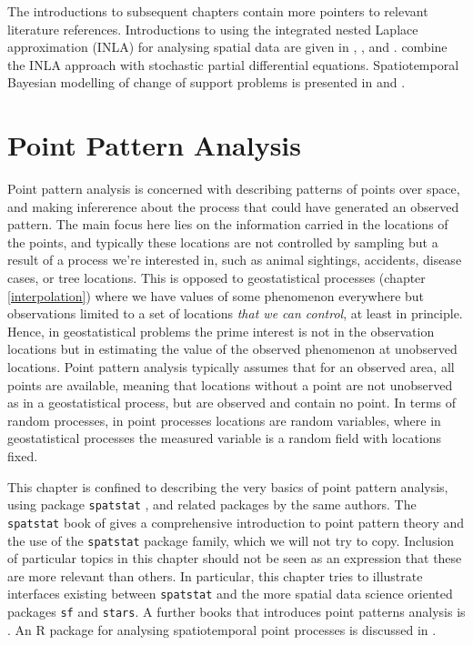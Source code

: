 \documentclass[]{book}
\begin{document}
The introductions to subsequent chapters contain more pointers
to relevant literature references. Introductions to using the
integrated nested Laplace approximation (INLA) for analysing spatial
data are given in \citet{BLANGIARDO201333}, \citet{blangiardo2015spatial}, and
\citet{gomez2020bayesian}. \citet{krainski2018advanced} combine the INLA approach
with stochastic partial differential equations. Spatiotemporal
Bayesian modelling of change of support problems is presented in
\citet{stcos} and \citet{R-stcos}.

\hypertarget{pointpatterns}{%
\chapter{Point Pattern Analysis}\label{pointpatterns}}

Point pattern analysis is concerned with describing patterns of
points over space, and making infererence about the process that
could have generated an observed pattern. The main focus here lies on
the information carried in the locations of the points, and typically
these locations are not controlled by sampling but a result of a
process we're interested in, such as animal sightings, accidents,
disease cases, or tree locations. This is opposed to geostatistical
processes (chapter \ref{interpolation}) where we have values of
some phenomenon everywhere but observations limited to a set of
locations \emph{that we can control}, at least in principle. Hence, in
geostatistical problems the prime interest is not in the observation
locations but in estimating the value of the observed phenomenon
at unobserved locations. Point pattern analysis typically assumes
that for an observed area, all points are available, meaning that
locations without a point are not unobserved as in a geostatistical
process, but are observed and contain no point. In terms of random
processes, in point processes locations are random variables, where
in geostatistical processes the measured variable is a random field
with locations fixed.

This chapter is confined to describing the very basics of point
pattern analysis, using package \texttt{spatstat} \citep{R-spatstat}, and
related packages by the same authors. The \texttt{spatstat} book of
\citet{baddeley2015spatial} gives a comprehensive introduction to point
pattern theory and the use of the \texttt{spatstat} package family,
which we will not try to copy. Inclusion of particular topics in
this chapter should not be seen as an expression that these are
more relevant than others. In particular, this chapter tries to
illustrate interfaces existing between \texttt{spatstat} and the more
spatial data science oriented packages \texttt{sf} and \texttt{stars}.
A further books that introduces point patterns analysis is
\citet{STOYAN2017125}. An R package for analysing spatiotemporal
point processes is discussed in \citet{stpp}.
\end{document}
